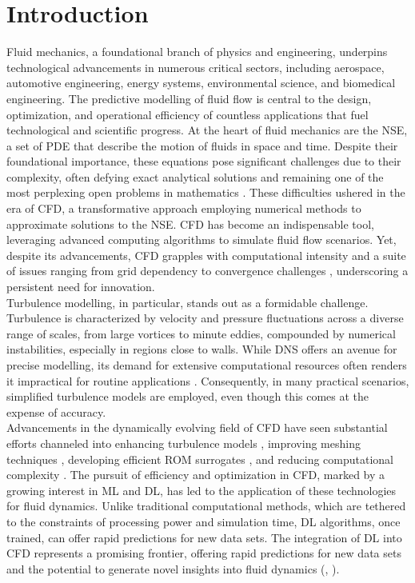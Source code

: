 \chapter{Introduction}
\label{chap:Intro}
Fluid mechanics, a foundational branch of physics and engineering, underpins technological advancements in numerous critical sectors, including aerospace, automotive engineering, energy systems, environmental science, and biomedical engineering. The predictive modelling of fluid flow is central to the design, optimization, and operational efficiency of countless applications that fuel technological and scientific progress. At the heart of fluid mechanics are the \gls{NSE}, a set of \gls{PDE} that describe the motion of fluids in space and time. Despite their foundational importance, these equations pose significant challenges due to their complexity, often defying exact analytical solutions and remaining one of the most perplexing open problems in mathematics \cite{fefferman2006existence}. These difficulties ushered in the era of \gls{CFD}, a transformative approach employing numerical methods to approximate solutions to the NSE. CFD has become an indispensable tool, leveraging advanced computing algorithms to simulate fluid flow scenarios. Yet, despite its advancements, CFD grapples with computational intensity and a suite of issues ranging from grid dependency to convergence challenges  \cite{ferziger2002computational}, underscoring a persistent need for innovation.\\
Turbulence modelling, in particular, stands out as a formidable challenge. Turbulence is characterized by velocity and pressure fluctuations across a diverse range of scales, from large vortices to minute eddies, compounded by numerical instabilities, especially in regions close to walls. While \gls{DNS} offers an avenue for precise modelling, its demand for extensive computational resources often renders it impractical for routine applications  \cite{moin1998direct}. Consequently, in many practical scenarios, simplified turbulence models are employed, even though this comes at the expense of accuracy.\\
Advancements in the dynamically evolving field of CFD have seen substantial efforts channeled into enhancing turbulence models \cite{pope2000turbulent}, improving meshing techniques \cite{thompson1998automatic}, developing efficient \gls{ROM} surrogates \cite{benner2015survey}, and reducing computational complexity \cite{schmid2010dynamic}. The pursuit of efficiency and optimization in CFD, marked by a growing interest in \gls{ML} and \gls{DL}, has led to the application of these technologies for fluid dynamics. Unlike traditional computational methods, which are tethered to the constraints of processing power and simulation time, DL algorithms, once trained, can offer rapid predictions for new data sets. The integration of DL into CFD represents a promising frontier, offering rapid predictions for new data sets and the potential to generate novel insights into fluid dynamics (\cite{kutz2017deep}, \cite{raissi2019physics}).\\

